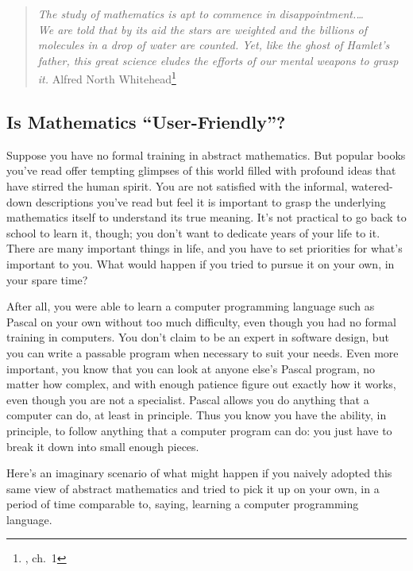 \begin{quote}
  {\em The study of mathematics is apt to commence in
dis\-ap\-point\-ment.\ldots \\
We are told that by its aid the stars are weighted
and the billions of molecules in a drop of water are counted.  Yet, like the
ghost of Hamlet's father, this great science eludes the efforts of our mental
weapons to grasp it.}
  \flushright\sc  Alfred North Whitehead\footnote{\cite{Whitehead}, ch.\ 1}\\
\end{quote}

\subsection{Is Mathematics ``User-Friendly''?}

Suppose you have no formal training in abstract mathematics.  But popular
books you've read offer tempting glimpses of this world filled with profound
ideas that have stirred the human spirit.  You are not satisfied with the
informal, watered-down descriptions you've read but feel it is important to
grasp the underlying mathematics itself to understand its true meaning. It's
not practical to go back to school to learn it, though; you don't want to
dedicate years of your life to it.  There are many important things in life,
and you have to set priorities for what's important to you.  What would happen
if you tried to pursue it on your own, in your spare time?

After all, you were able to learn a computer programming language such as
Pascal on your own without too much difficulty, even though you had no formal
training in computers.  You don't claim to be an expert in software design,
but you can write a passable program when necessary to suit your needs.  Even
more important, you know that you can look at anyone else's Pascal program, no
matter how complex, and with enough patience figure out exactly how it works,
even though you are not a specialist.  Pascal allows you do anything that a
computer can do, at least in principle.  Thus you know you have the ability,
in principle, to follow anything that a computer program can do:  you just
have to break it down into small enough pieces.

Here's an imaginary scenario of what might happen if you na\-ive\-ly a\-dopted
this same view of abstract mathematics and tried to pick it up on your own, in
a period of time comparable to, saying, learning a computer programming
language.

